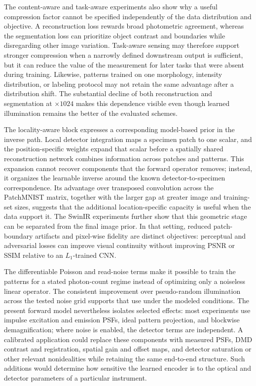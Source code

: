 \documentclass{optica-article}
\begin{document}
The content-aware and task-aware experiments also show why a useful compression factor cannot be specified independently of the data distribution and objective. A reconstruction loss rewards broad photometric agreement, whereas the segmentation loss can prioritize object contrast and boundaries while disregarding other image variation. Task-aware sensing may therefore support stronger compression when a narrowly defined downstream output is sufficient, but it can reduce the value of the measurement for later tasks that were absent during training. Likewise, patterns trained on one morphology, intensity distribution, or labeling protocol may not retain the same advantage after a distribution shift. The substantial decline of both reconstruction and segmentation at $\times1024$ makes this dependence visible even though learned illumination remains the better of the evaluated schemes.

The locality-aware block expresses a corresponding model-based prior in the inverse path. Local detector integration maps a specimen patch to one scalar, and the position-specific weights expand that scalar before a spatially shared reconstruction network combines information across patches and patterns. This expansion cannot recover components that the forward operator removes; instead, it organizes the learnable inverse around the known detector-to-specimen correspondence. Its advantage over transposed convolution across the PatchMNIST matrix, together with the larger gap at greater image and training-set sizes, suggests that the additional location-specific capacity is useful when the data support it. The SwinIR experiments further show that this geometric stage can be separated from the final image prior. In that setting, reduced patch-boundary artifacts and pixel-wise fidelity are distinct objectives: perceptual and adversarial losses can improve visual continuity without improving PSNR or SSIM relative to an $L_1$-trained CNN.

The differentiable Poisson and read-noise terms make it possible to train the patterns for a stated photon-count regime instead of optimizing only a noiseless linear operator. The consistent improvement over pseudo-random illumination across the tested noise grid supports that use under the modeled conditions. The present forward model nevertheless isolates selected effects: most experiments use impulse excitation and emission PSFs, ideal pattern projection, and blockwise demagnification; where noise is enabled, the detector terms are independent. A calibrated application could replace these components with measured PSFs, DMD contrast and registration, spatial gain and offset maps, and detector saturation or other relevant nonidealities while retaining the same end-to-end structure. Such additions would determine how sensitive the learned encoder is to the optical and detector parameters of a particular instrument.
\end{document}
